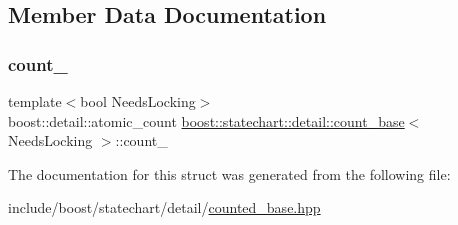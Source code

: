 \subsection{Member Data Documentation}
\mbox{\label{structboost_1_1statechart_1_1detail_1_1count__base_adc3f06d7b2306b350738229905fb9b10}} 
\subsubsection{\texorpdfstring{count\+\_\+}{count\_}}
{\footnotesize\ttfamily template$<$bool Needs\+Locking$>$ \\
boost\+::detail\+::atomic\+\_\+count \mbox{\hyperlink{structboost_1_1statechart_1_1detail_1_1count__base}{boost\+::statechart\+::detail\+::count\+\_\+base}}$<$ Needs\+Locking $>$\+::count\+\_\+\hspace{0.3cm}{\ttfamily [mutable]}}



The documentation for this struct was generated from the following file\+:\begin{DoxyCompactItemize}
\item 
include/boost/statechart/detail/\mbox{\hyperlink{counted__base_8hpp}{counted\+\_\+base.\+hpp}}\end{DoxyCompactItemize}
